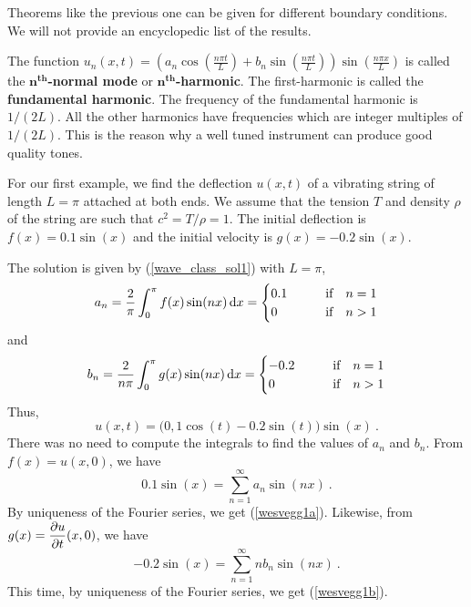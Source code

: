Theorems like the previous one can be given for different boundary
conditions.  We will not provide an encyclopedic list of the results.

\begin{rmk}
The function
$\displaystyle u_n(x,t) = \left(a_n\cos\left(\frac{n\pi t}{L}\right)
+ b_n \sin\left(\frac{n\pi t}{L}\right)\right)
\sin\left(\frac{n\pi x}{L}\right)$ is called the
{\bfseries $\mathbf{n^{th}}$-normal mode} or {\bfseries $\mathbf{n^{th}}$-harmonic}.  The first-harmonic is called the
{\bfseries fundamental harmonic}.
The frequency of the fundamental harmonic is $1/(2L)$.  All the other
harmonics have frequencies which are integer multiples of $1/(2L)$.  This is
the reason why a well tuned instrument can produce good quality tones.
\end{rmk}

\begin{egg}
For our first example, we find the deflection $u(x,t)$ of a vibrating
string of length $L=\pi$ attached at both ends.  We assume that the
tension $T$ and density $\rho$ of the string are such that
$c^2 = T/\rho = 1$.  The initial deflection is
$f(x) = 0.1 \sin(x)$ and the initial velocity is $g(x) = -0.2 \sin(x)$.

The solution is given by (\ref{wave_class_sol1}) with $L=\pi$,
\begin{equation} \label{wesvegg1a}
a_n = \frac{2}{\pi} \int_0^\pi f(x) \sin(n x) \,\mathrm{d}{x} =
\begin{cases}
0.1 & \qquad \text{if} \quad n=1 \\
0 & \qquad \text{if} \quad n>1 \\
\end{cases}
\end{equation}
and
\begin{equation} \label{wesvegg1b}
b_n = \frac{2}{n\pi} \int_0^\pi g(x) \sin(n x) \,\mathrm{d}{x} =
\begin{cases}
-0.2 & \qquad \text{if} \quad n=1 \\
0 & \qquad \text{if} \quad n>1 \\
\end{cases}
\end{equation}
Thus,
\[
u(x,t) = \big(0,1 \cos(t) - 0.2 \sin(t) \big) \sin(x) \ .
\]
There was no need to compute the integrals to find the values of $a_n$
and $b_n$.  From $f(x) = u(x,0)$, we have
\[
0.1 \sin(x) = \sum_{n=1}^\infty a_n \sin(n x) \ .
\]
By uniqueness of the Fourier series, we get (\ref{wesvegg1a}).  Likewise,
from $\displaystyle g(x) = \frac{\partial{u}}{\partial t}(x,0)$, we have
\[
-0.2 \sin(x) = \sum_{n=1}^\infty n b_n \sin(n x) \ .
\]
This time, by uniqueness of the Fourier series, we get
(\ref{wesvegg1b}).
\end{egg}

